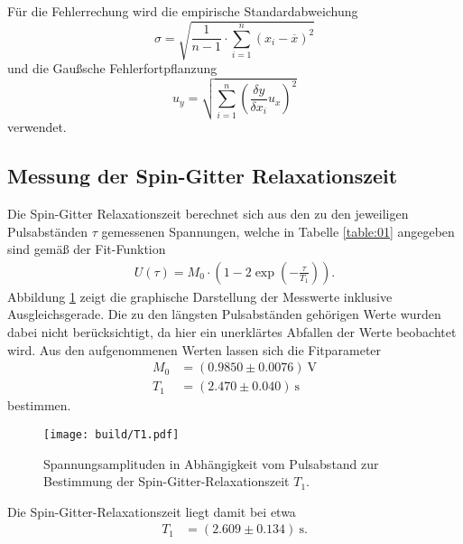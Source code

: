 \noindent Für die Fehlerrechung wird die empirische Standardabweichung
\begin{equation}
  \sigma = \sqrt{\frac{1}{n-1} \cdot \sum_{i=1}^n(x_i-\overline{x})^2}
  \label{eqn:Stdabweichung}
\end{equation}
und die Gaußsche Fehlerfortpflanzung
\begin{equation}
  u_y = \sqrt{\sum_{i=1}^n\left(\frac{\delta y}{\delta x_i}u_x\right)^2}
  \label{eqn:gauß}
\end{equation}
verwendet.
\subsection{Messung der Spin-Gitter Relaxationszeit}
\noindent Die Spin-Gitter Relaxationszeit berechnet sich aus den zu den
jeweiligen Pulsabständen $\tau$ gemessenen Spannungen, welche in Tabelle
\ref{table:01} angegeben sind gemäß der Fit-Funktion
\begin{align}
  U(\tau) = M_0 \cdot \left(1 - 2\exp{\left(- \frac{\tau}{T_1}\right)}\right).
  \label{eqn:03}
\end{align}
\noindent Abbildung \ref{fig:01} zeigt die graphische Darstellung der Messwerte
inklusive Ausgleichsgerade. Die zu den längsten Pulsabständen gehörigen Werte
wurden dabei nicht berücksichtigt, da hier ein unerklärtes Abfallen der Werte beobachtet wird.
Aus den aufgenommenen Werten lassen sich die Fitparameter
\begin{align*}
  M_0 &=  (0.9850  \pm  0.0076) \: \si{\volt} \\
  T_1 &=  (2.470  \pm  0.040) \: \si{\second}
\end{align*}
\noindent bestimmen.
\FloatBarrier

\FloatBarrier
\FloatBarrier
\begin{figure}
  \texttt{[image: build/T1.pdf]}
  \caption{Spannungsamplituden in Abhängigkeit vom Pulsabstand zur Bestimmung
           der Spin-Gitter-Relaxationszeit $T_1$.}
  \label{fig:01}
\end{figure}
\FloatBarrier
\noindent Die Spin-Gitter-Relaxationszeit liegt damit bei etwa
\begin{align*}
  T_1 &=  (2.609  \pm  0.134) \: \si{\second}.
\end{align*}
